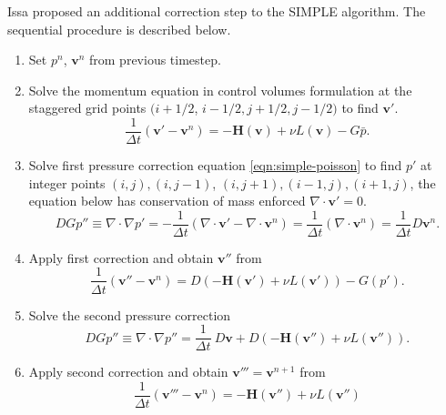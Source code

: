 \documentclass{article}
\begin{document}
Issa \cite{Issa:1985,Issa:1986} proposed an additional correction step to the SIMPLE algorithm. The sequential procedure is described below.
\begin{enumerate}
	\item \label{piso:1} Set ${p}^n$, $\boldsymbol{v}^n$ from previous timestep.
	\item \label{piso:2} Solve the momentum equation in control volumes formulation at the staggered grid points $(i+1 / 2$, $i-1 / 2, j+1 / 2, j-1 / 2)$ to find $\boldsymbol{v'}$.
			\begin{equation}
				\frac{1}{\Delta t} \left( \boldsymbol{v'} - \boldsymbol{v}^n\right) = -\mathbf{H}(\boldsymbol{v}) + \nu L(\boldsymbol{v})-G\bar p.
			\end{equation}
	\item \label{piso:3} Solve first pressure correction equation \eqref{eqn:simple-poisson} to find $p'$ at integer points $(i, j),(i, j-1)$, $(i, j+1),(i-1, j),(i+1, j)$, the equation below has conservation of mass enforced $\nabla\cdot\boldsymbol{v}'=0$. 
			\begin{equation}
				DGp''\equiv\nabla \cdot \nabla p' = -\frac{1}{\Delta t}\left( \nabla \cdot \boldsymbol{v}' - \nabla\cdot \boldsymbol{v}^n\right)=\frac{1}{\Delta t}\left(\nabla\cdot \boldsymbol{v}^n\right)=\frac{1}{\Delta t}D\boldsymbol{v}^n .
			\end{equation}
	\item \label{piso:4} Apply first correction and obtain $\boldsymbol{v}''$ from
			\begin{equation}
				\frac{1}{\Delta t}\left( \boldsymbol{v}'' - \boldsymbol{v}^n\right) = D(-\mathbf{H}(\boldsymbol{v}') + \nu L(\boldsymbol{v}'))-G(p').
			\end{equation}
	\item \label{piso:5} Solve the second pressure correction
			\begin{equation}
				DGp''\equiv\nabla\cdot\nabla p'' = \frac{1}{\Delta t}\ D\boldsymbol{v}+D\left(-\mathbf{H}(\boldsymbol{v}'') + \nu L(\boldsymbol{v}'')\right).
			\end{equation}
	\item \label{piso:6} Apply second correction and obtain $\boldsymbol{v}'''=\boldsymbol{v}^{n+1}$ from
			\begin{equation}
				\frac{1}{\Delta t} \left(\boldsymbol{v}''' - \boldsymbol{v}^n \right)=-\mathbf{H}(\boldsymbol{v}'') + \nu L(\boldsymbol{v}'')
			\end{equation}
\end{enumerate}
\end{document}
